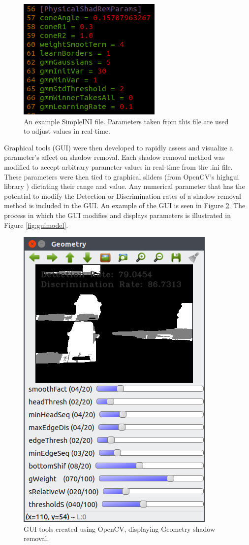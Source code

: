 \begin{figure}
  \centering
  \includegraphics[width=.5\linewidth]{figures/simpleini.png}
  \caption{An example SimpleINI file. Parameters taken from this file are used to adjust values in real-time.}
  \label{fig:simpleini}
\end{figure}

Graphical tools (GUI) were then developed to rapidly assess and visualize a parameter's affect on shadow removal. Each shadow removal method was modified to accept arbitrary parameter values in real-time from the .ini file. These parameters were then tied to graphical sliders (from OpenCV's highgui library \cite{opencv}) dictating their range and value. Any numerical parameter that has the potential to modify the Detection or Discrimination rates of a shadow removal method is included in the GUI. An example of the GUI is seen in Figure \ref{fig:guitools}. The process in which the GUI modifies and displays parameters is illustrated in Figure \ref{fig:guimodel}.

\begin{figure}
  \centering
  \includegraphics[width=.45\linewidth]{figures/geo_highway1_default.png}

\caption{GUI tools created using OpenCV, displaying Geometry shadow removal.}
\label{fig:guitools}
\end{figure}

